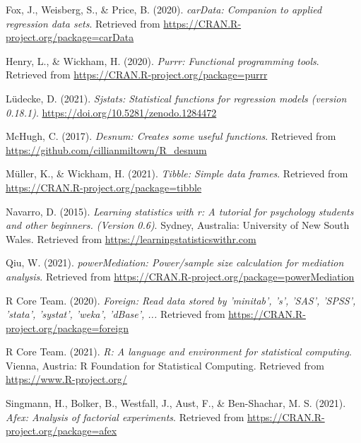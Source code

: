 \documentclass[
  man]{apa6}
\newlength{\cslhangindent}
\newlength{\cslentryspacingunit} %
\newenvironment{CSLReferences}[2] %
 {%
  \setlength{\parindent}{0pt}
  \ifodd #1
  \let\oldpar\par
  \def\par{\hangindent=\cslhangindent\oldpar}
  \fi
  \setlength{\parskip}{#2\cslentryspacingunit}
 }%
 {}
\begin{document}
\begin{CSLReferences}{1}{0}
\leavevmode{}%
Fox, J., Weisberg, S., \& Price, B. (2020). \emph{carData: Companion to applied regression data sets}. Retrieved from \url{https://CRAN.R-project.org/package=carData}

\leavevmode{}%
Henry, L., \& Wickham, H. (2020). \emph{Purrr: Functional programming tools}. Retrieved from \url{https://CRAN.R-project.org/package=purrr}

\leavevmode{}%
Lüdecke, D. (2021). \emph{Sjstats: Statistical functions for regression models (version 0.18.1)}. \url{https://doi.org/10.5281/zenodo.1284472}

\leavevmode{}%
McHugh, C. (2017). \emph{Desnum: Creates some useful functions}. Retrieved from \url{https://github.com/cillianmiltown/R_desnum}

\leavevmode{}%
Müller, K., \& Wickham, H. (2021). \emph{Tibble: Simple data frames}. Retrieved from \url{https://CRAN.R-project.org/package=tibble}

\leavevmode{}%
Navarro, D. (2015). \emph{Learning statistics with r: A tutorial for psychology students and other beginners. (Version 0.6)}. Sydney, Australia: University of New South Wales. Retrieved from \url{https://learningstatisticswithr.com}

\leavevmode{}%
Qiu, W. (2021). \emph{powerMediation: Power/sample size calculation for mediation analysis}. Retrieved from \url{https://CRAN.R-project.org/package=powerMediation}

\leavevmode{}%
R Core Team. (2020). \emph{Foreign: Read data stored by 'minitab', 's', 'SAS', 'SPSS', 'stata', 'systat', 'weka', 'dBase', ...} Retrieved from \url{https://CRAN.R-project.org/package=foreign}

\leavevmode{}%
R Core Team. (2021). \emph{R: A language and environment for statistical computing}. Vienna, Austria: R Foundation for Statistical Computing. Retrieved from \url{https://www.R-project.org/}

\leavevmode{}%
Singmann, H., Bolker, B., Westfall, J., Aust, F., \& Ben-Shachar, M. S. (2021). \emph{Afex: Analysis of factorial experiments}. Retrieved from \url{https://CRAN.R-project.org/package=afex}


\end{CSLReferences}
\end{document}
